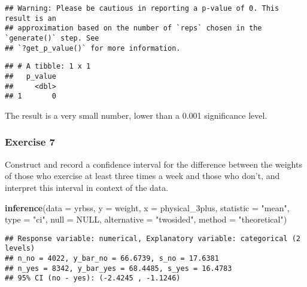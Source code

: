 \documentclass[
]{article}
\newenvironment{Shaded}{\begin{snugshade}}{\end{snugshade}}
\newcommand{\DataTypeTok}[1]{\textcolor[rgb]{0.13,0.29,0.53}{#1}}
\newcommand{\KeywordTok}[1]{\textcolor[rgb]{0.13,0.29,0.53}{\textbf{#1}}}
\newcommand{\NormalTok}[1]{#1}
\newcommand{\OperatorTok}[1]{\textcolor[rgb]{0.81,0.36,0.00}{\textbf{#1}}}
\newcommand{\OtherTok}[1]{\textcolor[rgb]{0.56,0.35,0.01}{#1}}
\newcommand{\StringTok}[1]{\textcolor[rgb]{0.31,0.60,0.02}{#1}}
\begin{document}
\begin{Shaded}
\end{Shaded}

\begin{verbatim}
## Warning: Please be cautious in reporting a p-value of 0. This result is an
## approximation based on the number of `reps` chosen in the `generate()` step. See
## `?get_p_value()` for more information.
\end{verbatim}

\begin{verbatim}
## # A tibble: 1 x 1
##   p_value
##     <dbl>
## 1       0
\end{verbatim}

The result is a very small number, lower than a 0.001 significance
level.

\hypertarget{exercise-7}{%
\subsubsection{Exercise 7}\label{exercise-7}}

Construct and record a confidence interval for the difference between
the weights of those who exercise at least three times a week and those
who don't, and interpret this interval in context of the data.

\begin{Shaded}
\begin{Highlighting}[]
\KeywordTok{inference}\NormalTok{(}\DataTypeTok{data =}\NormalTok{ yrbss, }\DataTypeTok{y =}\NormalTok{ weight, }\DataTypeTok{x =}\NormalTok{ physical_3plus,}
          \DataTypeTok{statistic =} \StringTok{"mean"}\NormalTok{,}
          \DataTypeTok{type =} \StringTok{"ci"}\NormalTok{, }
          \DataTypeTok{null =} \OtherTok{NULL}\NormalTok{, }
          \DataTypeTok{alternative =} \StringTok{"twosided"}\NormalTok{, }
          \DataTypeTok{method =} \StringTok{"theoretical"}\NormalTok{)}
\end{Highlighting}
\end{Shaded}

\begin{verbatim}
## Response variable: numerical, Explanatory variable: categorical (2 levels)
## n_no = 4022, y_bar_no = 66.6739, s_no = 17.6381
## n_yes = 8342, y_bar_yes = 68.4485, s_yes = 16.4783
## 95% CI (no - yes): (-2.4245 , -1.1246)
\end{verbatim}
\end{document}
